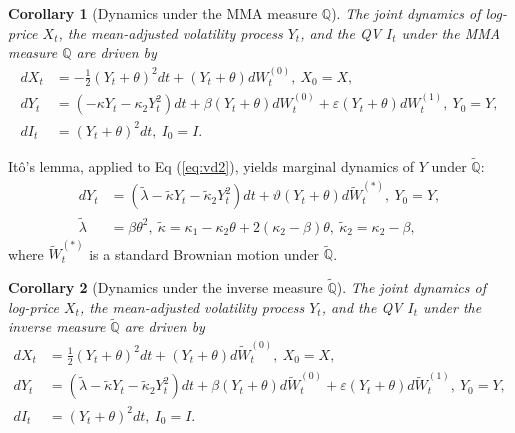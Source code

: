 \documentclass[pdftex,11pt,a4paper] {article}
\newtheorem{corollary}{Corollary}[section]
\begin{document}
\begin{corollary}[Dynamics under the MMA measure $\mathbb{Q}$]\label{coroll:mma_dynam} The joint dynamics of log-price $X_t$, the mean-adjusted volatility process $Y_t$, and the QV $I_t$ under the MMA measure $\mathbb{Q}$ are driven by
\begin{equation} \label{eq:svmd2}
\begin{split}
dX_{t}&= -\frac{1}{2}\left(Y_{t}+\theta\right)^{2}dt+\left(Y_{t}+\theta\right)dW^{(0)}_{t}, \ X_{0} =X, \\
dY_{t}& = \left(-\kappa Y_{t}-\kappa_{2}Y^{2}_{t}\right)dt +  \beta  \left(Y_{t}+\theta\right)dW^{(0)}_{t} +  \varepsilon \left(Y_{t}+\theta\right)dW^{(1)}_{t}, \ Y_{0}=Y, \\
dI_{t}&=\left(Y_{t}+\theta\right)^{2}dt, \ I_{0}=I.
\end{split}
\end{equation}
\end{corollary}


It\^{o}'s lemma, applied to Eq (\ref{eq:vd2}), yields marginal dynamics of $Y$ under $\tilde{\mathbb{Q}}$:
\begin{equation} \label{eq:vd3}
\begin{split}
dY_{t} &=  \left(\tilde\lambda- \tilde\kappa Y_{t}   - \tilde\kappa_{2}Y^{2}_{t}\right)dt+ \vartheta \left(Y_{t}+\theta\right) d\widetilde W^{(*)}_{t}, \ Y_{0}=Y, \\
\tilde\lambda &= \beta\theta^{2}, \ \tilde\kappa = \kappa_{1} - \kappa_{2}\theta +2(\kappa_{2}-\beta)\theta, \ \tilde\kappa_2 = \kappa_{2} - \beta,
\end{split}
\end{equation}
where $\widetilde W^{(*)}_{t}$ is a standard Brownian motion under $\tilde{\mathbb{Q}}$.


\begin{corollary}[Dynamics under the inverse measure $\tilde{\mathbb{Q}}$] The joint dynamics of log-price $X_t$, the mean-adjusted volatility process $Y_t$, and the QV $I_t$ under the inverse measure $\tilde{\mathbb{Q}}$ are driven by
\begin{equation} \label{eq:inverse}
\begin{split}
dX_{t}&= \frac{1}{2}\left(Y_{t}+\theta\right)^{2}dt+\left(Y_{t}+\theta\right)d\widetilde W^{(0)}_{t}, \ X_{0} =X, \\
dY_{t}& = \left(\tilde\lambda-\tilde\kappa Y_{t}-\tilde\kappa_{2}Y^{2}_{t}\right)dt +  \beta  \left(Y_{t}+\theta\right)d\widetilde W^{(0)}_{t} +  \varepsilon \left(Y_{t}+\theta\right)d\widetilde W^{(1)}_{t}, \ Y_{0}=Y, \\
dI_{t}&=\left(Y_{t}+\theta\right)^{2}dt, \ I_{0}=I.
\end{split}
\end{equation}
\end{corollary}
\end{document}
